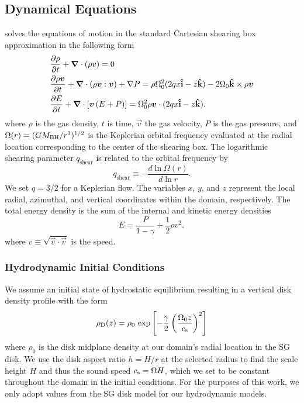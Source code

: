 \subsection{Dynamical Equations} \label{sec:dyn-eq}
 solves the equations of motion in the standard Cartesian shearing box approximation in the following form
\begin{align}
    &\frac{\partial{\rho}}{\partial{t}} + {\boldsymbol{\nabla}}\cdot{\left(\rho{\boldsymbol{}}{v}\right)} = 0
    \label{eqn:cons_mass} \\
    &\frac{\partial{\rho {\boldsymbol{v}}}}{\partial{t}} + {\boldsymbol{\nabla}}\cdot{\left(\rho {\boldsymbol{v}} : {\boldsymbol{v}}\right)} + \nabla P =
    \rho \Omega_{0}^{2}(2qx{\bf \hat{i}} - z{\bf \hat{k}}) - 2\Omega_{0} {\bf \hat{k}} \times \rho {\boldsymbol{v}}
    \label{eqn:cons_momentum} \\
    &\frac{\partial{E}}{\partial{t}} + {\boldsymbol{\nabla}}\cdot{\left[{\boldsymbol{v}}\left(E + P\right)\right]} =
    \Omega_{0}^{2}\rho{\boldsymbol{v}} \cdot (2qx{\bf \hat{i}} - z{\bf \hat{k}}).
    \label{eqn:cons_energy}
\end{align}
where $\rho$ is the gas density, $t$ is time, $\vec{v}$ the gas velocity, $P$ is the gas pressure, and $\Omega(r) = (GM_{\rm BH}/r^3)^{1/2}$ is the Keplerian orbital frequency evaluated at the radial location corresponding to the center of the shearing box.
The logarithmic shearing parameter $q_\text{shear}$ is related to the orbital frequency by
\begin{equation}
    q_\text{shear} \equiv -\frac{d\ln\Omega(r)}{d\ln r}.
\end{equation}
We set $q=3/2$ for a Keplerian flow.
The variables $x$, $y$, and $z$ represent the local radial, azimuthal, and vertical coordinates within the domain, respectively.
The total energy density is the sum of the internal and kinetic energy densities
\begin{equation}
    E = \frac{P}{1-\gamma} + \frac{1}{2}\rho v^2,
\end{equation}
where $v \equiv \sqrt{ \vec{v} \cdot \vec{v} }$ is the speed.


\subsubsection{Hydrodynamic Initial Conditions} \label{sec:ICs}

 \label{sec:disk-model}

We assume an initial state of hydrostatic equilibrium resulting in a vertical disk density profile with the form
\begin{equation} \label{eqn:disk-z-profile}
    \rho_{\rm D} (z) = \rho_0 \, \exp\left[-\frac{\gamma}{2} \left(\frac{\Omega_0 z}{c_{\rm s}}\right)^2 \right]
\end{equation}
where $\rho_0$ is the disk midplane density at our domain's radial location in the SG disk. We use the disk aspect ratio $h=H/r$ at the selected radius to find the scale height $H$ and thus the sound speed $c_{\rm s}=\Omega H$, which we set to be constant throughout the domain in the initial conditions.
For the purposes of this work, we only adopt values from the SG disk model for our hydrodynamic models.


